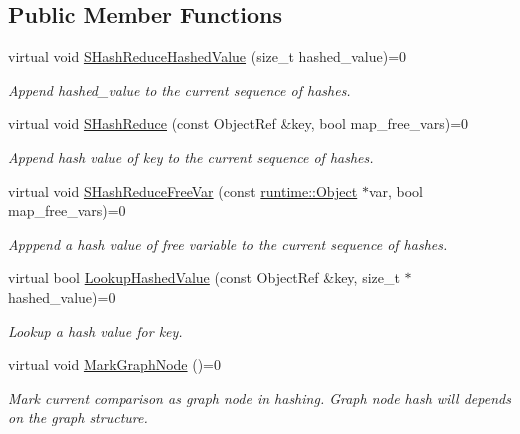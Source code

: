 \subsection*{Public Member Functions}
\begin{DoxyCompactItemize}
\item 
virtual void \hyperlink{classtvm_1_1SHashReducer_1_1Handler_a1bb22d4bb3983b4c3ca87b0daef7f93b}{S\+Hash\+Reduce\+Hashed\+Value} (size\+\_\+t hashed\+\_\+value)=0
\begin{DoxyCompactList}\small\item\em Append hashed\+\_\+value to the current sequence of hashes. \end{DoxyCompactList}\item 
virtual void \hyperlink{classtvm_1_1SHashReducer_1_1Handler_a6f9ddf0676a2bb500fedcf3892912c54}{S\+Hash\+Reduce} (const Object\+Ref \&key, bool map\+\_\+free\+\_\+vars)=0
\begin{DoxyCompactList}\small\item\em Append hash value of key to the current sequence of hashes. \end{DoxyCompactList}\item 
virtual void \hyperlink{classtvm_1_1SHashReducer_1_1Handler_ab2fe484814770615ef9ddb1f6a6f2dfb}{S\+Hash\+Reduce\+Free\+Var} (const \hyperlink{classtvm_1_1runtime_1_1Object}{runtime\+::\+Object} $\ast$var, bool map\+\_\+free\+\_\+vars)=0
\begin{DoxyCompactList}\small\item\em Apppend a hash value of free variable to the current sequence of hashes. \end{DoxyCompactList}\item 
virtual bool \hyperlink{classtvm_1_1SHashReducer_1_1Handler_a74fa7e570590ff3b040178cb50f48ee3}{Lookup\+Hashed\+Value} (const Object\+Ref \&key, size\+\_\+t $\ast$hashed\+\_\+value)=0
\begin{DoxyCompactList}\small\item\em Lookup a hash value for key. \end{DoxyCompactList}\item 
virtual void \hyperlink{classtvm_1_1SHashReducer_1_1Handler_a8f9a489881fc55552f13a58313a863cf}{Mark\+Graph\+Node} ()=0
\begin{DoxyCompactList}\small\item\em Mark current comparison as graph node in hashing. Graph node hash will depends on the graph structure. \end{DoxyCompactList}\end{DoxyCompactItemize}


